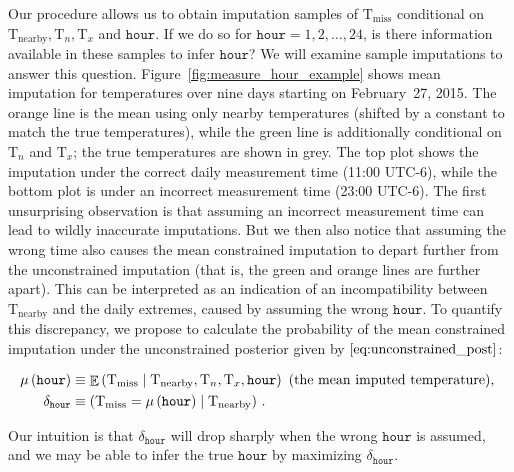 \documentclass[letter]{article}
\newcommand{\genericdel}[3]{%
      \left#1#3\right#2
    }
\newcommand{\del}[1]{\genericdel(){#1}}
\let\Pr\relax
\DeclareMathOperator{\Pr}{\mathbb{P}}
\DeclareMathOperator{\E}{\mathbb{E}}
\newcommand{\T}{\mathrm{T}}
\newcommand{\Tn}{\T_{n}}
\newcommand{\Tx}{\T_{x}}
\newcommand{\miss}{\mathrm{miss}}
\newcommand{\obs}{\mathrm{nearby}}
\newcommand{\hour}{\mathtt{hour}}
\newcommand{\discrepancy}{\delta}
\begin{document}
        Our procedure allows us to obtain imputation samples of \(\T_\miss\) conditional on \(\T_\obs,\Tn,\Tx\) and \(\hour\).
If we do so for \(\hour=1,2,\ldots,24\), is there information available in these samples to infer \(\hour\)?
We will examine sample imputations to answer this question.
Figure~\ref{fig:measure_hour_example} shows mean imputation for temperatures over nine days starting on February~27, 2015. The orange line is the mean using only nearby temperatures (shifted by a constant to match the true temperatures), while the green line is additionally conditional on \(\Tn\) and \(\Tx\); the true temperatures are shown in grey.
The top plot shows the imputation under the correct daily measurement time (11:00 UTC-6), while the bottom plot is under an incorrect measurement time (23:00 UTC-6).
The first unsurprising observation is that assuming an incorrect measurement time can lead to wildly inaccurate imputations.
But we then also notice that assuming the wrong time also causes the mean constrained imputation to depart further from the unconstrained imputation
(that is, the green and orange lines are further apart).
This can be interpreted as an indication of an incompatibility between \(\T_\obs\) and the daily extremes, caused by assuming the wrong \(\hour\).
To quantify this discrepancy, we propose to calculate the probability of the mean constrained imputation under the unconstrained posterior given by \(\eqref{eq:unconstrained_post}\):

\begin{equation}
\begin{split}
    \mu\del{\hour} &\equiv \E\del{ \T_\miss \mid \T_\obs, \Tn, \Tx, \hour } \text{ (the mean imputed temperature), }\\
    \discrepancy_\hour &\equiv \Pr\del{ \T_\miss = \mu\del{\hour} \mid \T_\obs }\,.
\end{split}
\end{equation}

Our intuition is that \(\discrepancy_\hour\) will drop sharply when the wrong \(\hour\) is assumed,
and we may be able to infer the true \(\hour\) by maximizing \(\discrepancy_\hour\).
    
\end{document}
